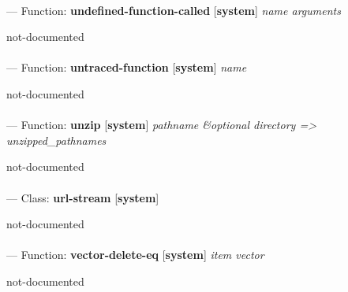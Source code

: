 \paragraph{}
\label{SYSTEM:UNDEFINED-FUNCTION-CALLED}
--- Function: \textbf{undefined-function-called} [\textbf{system}] \textit{name arguments}

\begin{adjustwidth}{5em}{5em}
not-documented
\end{adjustwidth}

\paragraph{}
\label{SYSTEM:UNTRACED-FUNCTION}
--- Function: \textbf{untraced-function} [\textbf{system}] \textit{name}

\begin{adjustwidth}{5em}{5em}
not-documented
\end{adjustwidth}

\paragraph{}
\label{SYSTEM:UNZIP}
--- Function: \textbf{unzip} [\textbf{system}] \textit{pathname \&optional directory => unzipped\_pathnames}

\begin{adjustwidth}{5em}{5em}
not-documented
\end{adjustwidth}

\paragraph{}
\label{SYSTEM:URL-STREAM}
--- Class: \textbf{url-stream} [\textbf{system}] \textit{}

\begin{adjustwidth}{5em}{5em}
not-documented
\end{adjustwidth}

\paragraph{}
\label{SYSTEM:VECTOR-DELETE-EQ}
--- Function: \textbf{vector-delete-eq} [\textbf{system}] \textit{item vector}

\begin{adjustwidth}{5em}{5em}
not-documented
\end{adjustwidth}

